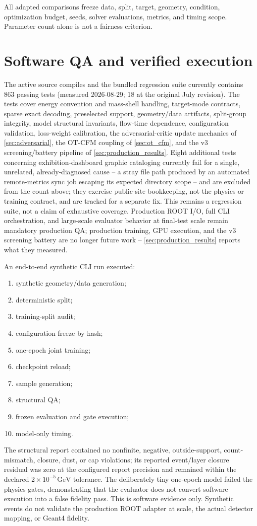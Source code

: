 \documentclass[10pt,a4paper]{article}
\newcommand{\GeV}{\,\mathrm{GeV}}
\begin{document}
All adapted comparisons freeze data, split, target, geometry, condition, optimization budget, seeds, solver evaluations, metrics, and timing scope. Parameter count alone is not a fairness criterion.

\section{Software QA and verified execution}
\label{sec:qa}

The active source compiles and the bundled regression suite currently contains 863 passing tests (measured 2026-08-29; 18 at the original July revision). The tests cover energy convention and mass-shell handling, target-mode contracts, sparse exact decoding, preselected support, geometry/data artifacts, split-group integrity, model structural invariants, flow-time dependence, configuration validation, loss-weight calibration, the adversarial-critic update mechanics of \cref{sec:adversarial}, the OT-CFM coupling of \cref{sec:ot_cfm}, and the v3 screening/battery pipeline of \cref{sec:production_results}. Eight additional tests concerning exhibition-dashboard graphic cataloging currently fail for a single, unrelated, already-diagnosed cause -- a stray file path produced by an automated remote-metrics sync job escaping its expected directory scope -- and are excluded from the count above; they exercise public-site bookkeeping, not the physics or training contract, and are tracked for a separate fix. This remains a regression suite, not a claim of exhaustive coverage. Production ROOT I/O, full CLI orchestration, and large-scale evaluator behavior at final-test scale remain mandatory production QA; production training, GPU execution, and the v3 screening battery are no longer future work -- \cref{sec:production_results} reports what they measured.

An end-to-end synthetic CLI run executed:
\begin{enumerate}
\item synthetic geometry/data generation;
\item deterministic split;
\item training-split audit;
\item configuration freeze by hash;
\item one-epoch joint training;
\item checkpoint reload;
\item sample generation;
\item structural QA;
\item frozen evaluation and gate execution;
\item model-only timing.
\end{enumerate}
The structural report contained no nonfinite, negative, outside-support, count-mismatch, closure, dust, or cap violations; its reported event/layer closure residual was zero at the configured report precision and remained within the declared $2\times10^{-5}\GeV$ tolerance. The deliberately tiny one-epoch model failed the physics gates, demonstrating that the evaluator does not convert software execution into a false fidelity pass. This is software evidence only. Synthetic events do not validate the production ROOT adapter at scale, the actual detector mapping, or Geant4 fidelity.
\end{document}
